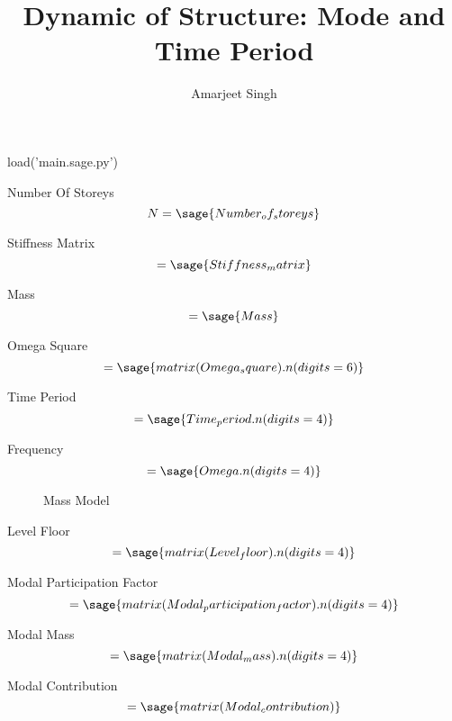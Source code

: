 \documentclass[12pt]{report}
\title{Dynamic of Structure: Mode and Time Period}
\author{Amarjeet Singh }
\begin{document}
\thispagestyle{plain}
	\begin{titlepage}
\maketitle
	\end{titlepage}

\begin{sagesilent}
	load('main.sage.py')
\end{sagesilent}

Number Of Storeys
\begin{equation}
	N = \sage{Number_of_storeys}
\end{equation}

Stiffness Matrix
\begin{equation}
	[K]=\sage{Stiffness_matrix}
\end{equation}

Mass
\begin{equation}
	 [M]=\sage{Mass}
\end{equation}

Omega Square
\begin{equation}
	[\omega^2] =\sage{matrix(Omega_square).n(digits=6)}
\end{equation}

Time Period
\begin{equation}
	[T]=\sage{Time_period.n(digits=4)}
\end{equation}

Frequency
\begin{equation}
	[\omega]=\sage{Omega.n(digits=4)}
\end{equation}

\begin{figure}
	\caption{Mass Model}
\end{figure}

Level Floor
\begin{equation}
	[L]=\sage{matrix(Level_floor).n(digits=4)}
\end{equation}

Modal Participation Factor
\begin{equation}
	 [p]=\sage{matrix(Modal_participation_factor).n(digits=4)}
\end{equation}

Modal Mass
\begin{equation}
	 [M_{{m}}]=\sage{matrix(Modal_mass).n(digits=4)}
\end{equation}

Modal Contribution
\begin{equation}
	[M_{{c}}]=\sage{matrix(Modal_contribution)}
\end{equation}
\end{document}
